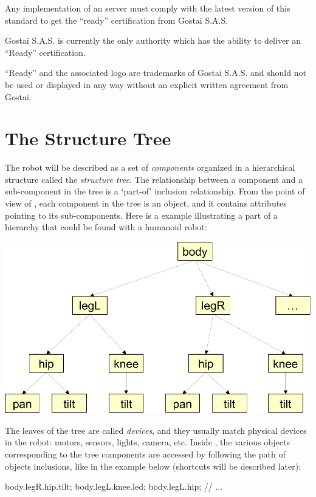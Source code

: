 Any implementation of an \urbi server must comply with the latest version
of this standard to get the ``\urbi ready''
certification from Gostai S.A.S.


Gostai S.A.S. is currently the only authority which has the ability to
deliver an ``\urbi Ready'' certification.

``\urbi Ready'' and the associated logo are trademarks of Gostai
S.A.S. and should not be used or displayed in any way without an
explicit written agreement from Gostai.

\section{The Structure Tree}

The robot will be described as a set of
\textit{components} organized in a hierarchical
structure called the \textit{structure tree}. The
relationship between a component and a sub-component in the tree is a
‘part-of’ inclusion relationship. From the point of view of \urbi, each
component in the tree is an object, and it contains attributes pointing
to its sub-components. Here is a example illustrating a part of a
hierarchy that could be found with a humanoid robot:

\begin{center}
  \includegraphics[width=.8\linewidth]{img/structure-tree}
\end{center}

The leaves of the tree are called
\textit{devices}, and they usually match physical
devices in the robot: motors, sensors, lights, camera, etc. Inside
\urbi, the various objects corresponding to the tree components are
accessed by following the path of objects inclusions, like in the
example below (shortcuts will be described later):

\begin{urbifixme}
body.legR.hip.tilt;
body.legL.knee.led;
body.legL.hip;
// ...
\end{urbifixme}


